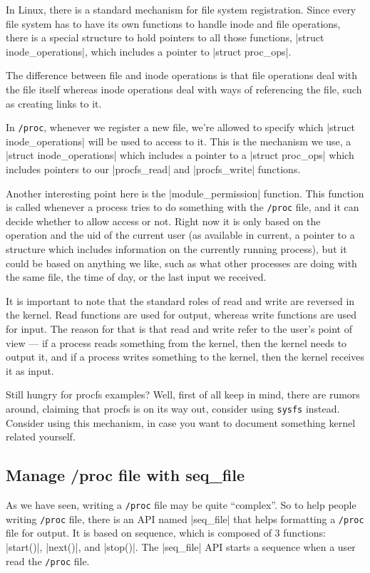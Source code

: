 \documentclass[10pt, oneside]{book}
\begin{document}
In Linux, there is a standard mechanism for file system registration.
Since every file system has to have its own functions to handle inode and file operations, there is a special structure to hold pointers to all those functions, \cpp|struct inode_operations|, which includes a pointer to \cpp|struct proc_ops|.

The difference between file and inode operations is that file operations deal with the file itself whereas inode operations deal with ways of referencing the file, such as creating links to it.

In \verb|/proc|, whenever we register a new file, we're allowed to specify which \cpp|struct inode_operations| will be used to access to it.
This is the mechanism we use, a \cpp|struct inode_operations| which includes a pointer to a \cpp|struct proc_ops| which includes pointers to our \cpp|procfs_read| and \cpp|procfs_write| functions.

Another interesting point here is the \cpp|module_permission| function.
This function is called whenever a process tries to do something with the \verb|/proc| file, and it can decide whether to allow access or not.
Right now it is only based on the operation and the uid of the current user (as available in current, a pointer to a structure which includes information on the currently running process), but it could be based on anything we like, such as what other processes are doing with the same file, the time of day, or the last input we received.

It is important to note that the standard roles of read and write are reversed in the kernel.
Read functions are used for output, whereas write functions are used for input.
The reason for that is that read and write refer to the user's point of view --- if a process reads something from the kernel, then the kernel needs to output it, and if a process writes something to the kernel, then the kernel receives it as input.


Still hungry for procfs examples?
Well, first of all keep in mind, there are rumors around, claiming that procfs is on its way out, consider using \verb|sysfs| instead.
Consider using this mechanism, in case you want to document something kernel related yourself.

\subsection{Manage /proc file with seq\_file}
\label{sec:manage_procfs_with_seq_file}
As we have seen, writing a \verb|/proc| file may be quite ``complex''.
So to help people writing \verb|/proc| file, there is an API named \cpp|seq_file| that helps formatting a \verb|/proc| file for output.
It is based on sequence, which is composed of 3 functions: \cpp|start()|, \cpp|next()|, and \cpp|stop()|.
The \cpp|seq_file| API starts a sequence when a user read the \verb|/proc| file.
\end{document}

